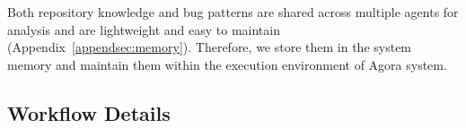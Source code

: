 \documentclass{article}
\theoremstyle{plain}
\theoremstyle{definition}
\theoremstyle{remark}
\newcommand{\consensustester}{Agora\xspace}
\newcommand{\agenta}{Orchestrator\xspace}
\newcommand{\agentb}{Strategy\xspace}
\newcommand{\agentc}{TestGen\xspace}
\begin{document}
Both repository knowledge and bug patterns are shared across multiple agents for analysis and are lightweight and easy to maintain (Appendix~\ref{appendsec:memory}). Therefore, we store them in the system memory and maintain them within the execution environment of \consensustester system.


\subsection{Workflow Details}





\end{document}
